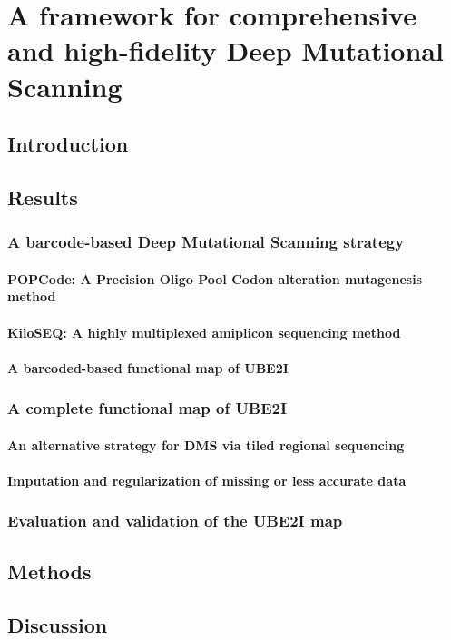 

\chapter{A framework for comprehensive and high-fidelity Deep Mutational Scanning}

\section{Introduction}

\section{Results}

\subsection{A barcode-based Deep Mutational Scanning strategy}

\subsubsection{POPCode: A Precision Oligo Pool Codon alteration mutagenesis method}

\subsubsection{KiloSEQ: A highly multiplexed amiplicon sequencing method}

\subsubsection{A barcoded-based functional map of UBE2I}

\subsection{A complete functional map of UBE2I}

\subsubsection{An alternative strategy for DMS via tiled regional sequencing}

\subsubsection{Imputation and regularization of missing or less accurate data}

\subsection{Evaluation and validation of the UBE2I map}

\section{Methods}

\section{Discussion}

